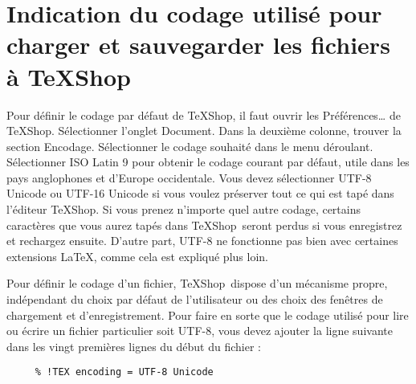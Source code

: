 \documentclass[11pt,french]{article}
\newcommand{\TS}{\textsf{\TeX Shop}}
\newcommand{\acr}[1]{\textsf{#1}}
\newcommand{\cmd}[1]{\textsf{#1}}
\begin{document}
\section{Indication du codage utilisé pour charger et sauvegarder les fichiers à \TS}

Pour définir le codage par défaut de \TS, il faut ouvrir les \cmd{Préférences…} de \TS. Sélectionner l'onglet \cmd{Document}. Dans la deuxième colonne, trouver la section \cmd{Encodage}. Sélectionner le codage souhaité dans le menu déroulant. Sélectionner \acr{ISO Latin 9} pour obtenir le codage courant par défaut, utile dans les pays anglophones et d'Europe occidentale. Vous devez sélectionner \acr{UTF-8 Unicode} ou \acr{UTF-16 Unicode} si vous voulez préserver tout ce qui est tapé dans l'éditeur \TS. Si vous prenez n'importe quel autre codage, certains caractères que vous aurez tapés dans \TS\ seront perdus si vous enregistrez et rechargez ensuite. D'autre part, \acr{UTF-8} ne fonctionne pas bien avec certaines extensions \LaTeX, comme cela est expliqué plus loin.

Pour définir le codage d'un fichier, \TS\ dispose d'un mécanisme propre, indépendant du choix par défaut de l'utilisateur ou des choix des fenêtres de chargement et d'enregistrement. Pour faire en sorte que le codage utilisé pour lire ou écrire un fichier particulier soit \acr{UTF-8}, vous devez ajouter la ligne suivante dans les vingt premières lignes du début du fichier :
\begin{verbatim}
     % !TEX encoding = UTF-8 Unicode
\end{verbatim}
\end{document}
